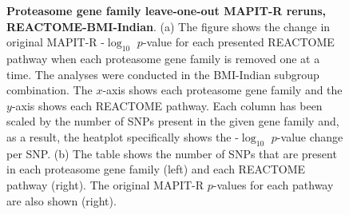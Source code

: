 \begin{figure}[ht]
\centering
\vspace*{-.5cm}
\par
{}
\caption[TBD]{\textbf{Proteasome gene family leave-one-out MAPIT-R reruns, REACTOME-BMI-Indian}. (a) The figure shows the change in original MAPIT-R -$\log_{10}$ $p$-value for each presented REACTOME pathway when each proteasome gene family is removed one at a time. The analyses were conducted in the BMI-Indian subgroup combination. The $x$-axis shows each proteasome gene family and the $y$-axis shows each REACTOME pathway. Each column has been scaled by the number of SNPs present in the given gene family and, as a result, the heatplot specifically shows the -$\log_{10}$ $p$-value change per SNP. (b) The table shows the number of SNPs that are present in each proteasome gene family (left) and each REACTOME pathway (right). The original MAPIT-R $p$-values for each pathway are also shown (right).}

\end{figure}
